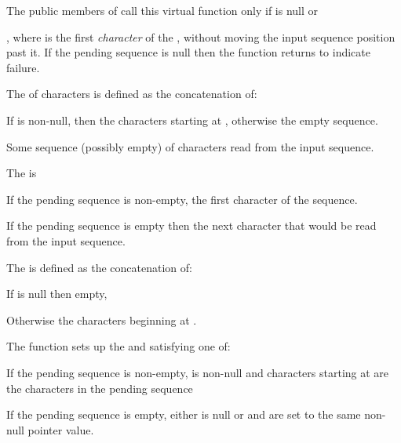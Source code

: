 \begin{itemdescr}
\pnum
\remarks
The public members of
call this virtual function only if
is null or

\pnum
\returns
{},
where  is the first
\textit{character}
of the
,
without moving the input sequence position past it.
If the pending sequence is null then the function returns
to indicate failure.

\pnum
The
of characters is defined as the concatenation of:
\begin{enumeratea}
\item
If
is non-null, then the
characters starting at
,
otherwise the empty sequence.
\item
Some sequence (possibly empty) of characters read from the input sequence.
\end{enumeratea}

\pnum
The
is
\begin{enumeratea}
\item
If the pending sequence is non-empty, the first character of the sequence.
\item
If the pending sequence
is
empty then the next character that would be read from the input sequence.
\end{enumeratea}

\pnum
The
is defined as the concatenation of:
\begin{enumeratea}
\item
If
is null then empty,
\item
Otherwise the
characters beginning at
.
\end{enumeratea}

\pnum
\effects
The function sets up the
and
satisfying one of:
\begin{enumeratea}
\item
If the pending sequence is non-empty,
is non-null and
characters starting at
are the characters in the pending sequence
\item
If the pending sequence is empty, either
is null or
and
are set to the same non-null pointer value.
\end{enumeratea}


\end{itemdescr}
